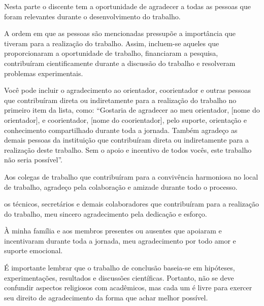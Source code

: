 %
\pagestyle{empty}

\begin{agradecimentos}
\begin{incisos}
\item Nesta parte o discente tem a oportunidade de agradecer a todas as pessoas que foram relevantes durante o desenvolvimento do trabalho.
\item A ordem em que as pessoas são mencionadas pressupõe a importância que tiveram para a realização do trabalho. Assim, incluem-se aqueles que proporcionaram a oportunidade de trabalho, financiaram a pesquisa, contribuíram cientificamente durante a discussão do trabalho e resolveram problemas experimentais.
\item Você pode incluir o agradecimento ao orientador, coorientador e outras pessoas que contribuíram direta ou indiretamente para a realização do trabalho no primeiro item da lista, como: ``Gostaria de agradecer ao meu orientador, [nome do orientador], e coorientador, [nome do coorientador], pelo suporte, orientação e conhecimento compartilhado durante toda a jornada. Também agradeço as demais pessoas da instituição que contribuíram direta ou indiretamente para a realização deste trabalho. Sem o apoio e incentivo de todos vocês, este trabalho não seria possível''.
\item Aos colegas de trabalho que contribuíram para a convivência harmoniosa no local de trabalho, agradeço pela colaboração e amizade durante todo o processo.
\item os técnicos, secretários e demais colaboradores que contribuíram para a realização do trabalho, meu sincero agradecimento pela dedicação e esforço.
\item 	À minha família e aos membros presentes ou ausentes que apoiaram e incentivaram durante toda a jornada, meu agradecimento por todo amor e suporte emocional.
\item É importante lembrar que o trabalho de conclusão baseia-se em hipóteses, experimentações, resultados e discussões científicas. Portanto, não se deve confundir aspectos religiosos com acadêmicos, mas cada um é livre para exercer seu direito de agradecimento da  forma que achar melhor possível. 
\end{incisos}

\end{agradecimentos}
